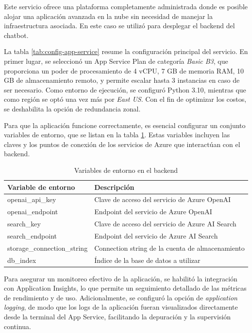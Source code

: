 Este servicio ofrece una plataforma completamente administrada donde es posible alojar una aplicación avanzada en la nube 
sin necesidad de manejar la infraestructura asociada. En este caso se utilizó para desplegar el backend del chatbot.

La tabla \ref{tab:config-app-service} resume la configuración principal del servicio. En primer lugar, se seleccionó un App Service Plan de categoría \textit{Basic B3}, que proporciona un poder de procesamiento de 
4 vCPU, 7 GB de memoria RAM, 10 GB de almacenamiento remoto, y permite escalar hasta 3 instancias en caso de ser necesario. 
Como entorno de ejecución, se configuró Python 3.10, mientras que como región se optó una vez más por \textit{East US}. Con el 
fin de optimizar los costos, se deshabilita la opción de redundancia zonal.

Para que la aplicación funcione correctamente, es esencial configurar un conjunto variables de entorno, que se listan en la tabla \ref{tab:config-env}. Estas 
variables incluyen las claves y los puntos de conexión de los servicios de Azure que interactúan con el backend. 

\begin{table}[h]
	\centering
	\caption[Variables de entorno en el backend]{Variables de entorno en el backend}
	\begin{tabular}{l l}    
		\toprule
		\textbf{Variable de entorno}  & \textbf{Descripción} 	                          \\
		\midrule
		openai\_api\_key              &	Clave de acceso del servicio de Azure OpenAI 	  \\		
		openai\_endpoint              & Endpoint del servicio de Azure OpenAI			  \\
		search\_key                   & Clave de acceso del servicio de Azure AI Search   \\
		search\_endpoint	          & Endpoint del servicio de Azure AI Search		  \\
        storage\_connection\_string   & Connection string de la cuenta de almacenamiento  \\
		db\_index	                  & Índice de la base de datos a utilizar		      \\
		\bottomrule
		\hline
	\end{tabular}
	\label{tab:config-env}
\end{table}

Para asegurar un monitoreo efectivo de la aplicación, se habilitó la integración con Application Insights, lo que permite un 
seguimiento detallado de las métricas de rendimiento y de uso. Adicionalmente, se configuró la opción de \textit{application logging}, 
de modo que los logs de la aplicación fueran visualizados directamente desde la terminal del App Service, facilitando la depuración 
y la supervisión continua.

